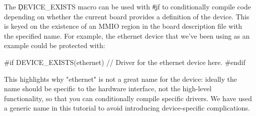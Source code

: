 The \c{DEVICE_EXISTS} macro can be used with \c{#if} to conditionally compile code depending on whether the current board provides a definition of the device.
This is keyed on the existence of an MMIO region in the board description file with the specified name.
For example, the ethernet device that we've been using as an example could be protected with:

\begin{cxxsnippet}
#if DEVICE_EXISTS(ethernet)
// Driver for the ethernet device here.
#endif
\end{cxxsnippet}

\begin{note}
This highlights why "ethernet" is not a great name for the device: ideally the name should be specific to the hardware interface, not the high-level functionality, so that you can conditionally compile specific drivers.
We have used a generic name in this tutorial to avoid introducing device-specific complications.
\end{note}
